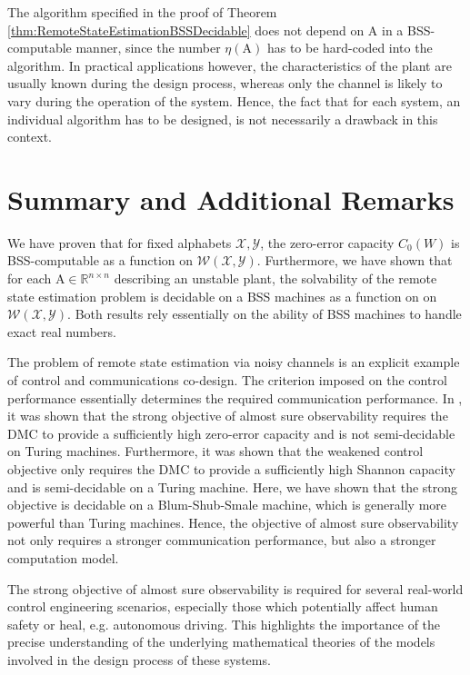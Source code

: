 \documentclass[conference]{IEEEtran}
\def\X{{\mathcal X}}
\def\Y{{\mathcal Y}}
\def\W{{\mathcal W}}
\def\RR{{\mathbb R}}
\def\mA{\bm{\mathrm{A}}}
\begin{document}
	The algorithm specified in the proof of Theorem \ref{thm:RemoteStateEstimationBSSDecidable} does not depend on \(\mA\) in a BSS-computable manner,
	since the number \(\eta(\mA)\) has to be hard-coded into the algorithm. In practical applications however, the characteristics of the plant
	are usually known during the design process, whereas only the channel is likely to vary during the operation
	of the system. Hence, the fact that for each system, an individual algorithm has to be designed, is not necessarily a drawback in this context.
	
\section{Summary and Additional Remarks}	\label{sec:Conclusion}
	We have proven that for fixed alphabets \(\X,\Y\), the zero-error capacity \(C_0(W)\) is BSS-computable as a function on \(\W(\X,\Y)\).
	Furthermore, we have shown that for each \(\mA\in \RR^{n\times n}\) describing an unstable plant, the solvability of the remote state estimation
	problem is decidable on a BSS machines as a function on on \(\W(\X,\Y)\). Both results rely essentially on the ability of BSS machines to handle exact real numbers.
	
	The problem of remote state estimation via noisy channels is an explicit example of control and communications co-design. The criterion imposed on the control performance
	essentially determines the required communication performance. In \cite{MS07,BoBoDe21TAC}, it was shown that the strong objective of almost sure observability requires the DMC to provide a sufficiently high
	zero-error capacity and is not semi-decidable on Turing machines. Furthermore, it was shown that the weakened control objective only requires the DMC to provide a sufficiently high
	Shannon capacity and is semi-decidable on a Turing machine. Here, we have shown that the strong objective is decidable on a Blum-Shub-Smale machine, which is generally more powerful than
	Turing machines. Hence, the objective of almost sure observability not only requires a stronger communication performance, but also a stronger computation model.
	
	The strong objective of almost sure observability is required for several real-world control engineering scenarios, especially those which potentially affect human safety or heal, e.g.
	autonomous driving. This highlights the importance of the precise understanding of the underlying mathematical theories of the models involved in the design process of these systems.
	
\end{document}
